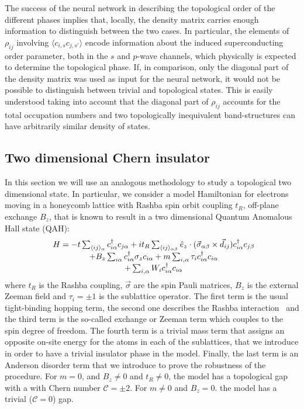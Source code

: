 The success of the neural network in describing the topological order of the
different phases implies that, locally, the density matrix carries
enough information to distinguish between the two cases. In particular, the
elements of $\rho_{ij}$ involving $\langle c_{i,s} c_{j,s'}\rangle$ encode
information about the induced superconducting order parameter, both in the $s$
and $p$-wave channels, which physically is expected to determine the topological
phase.
If, in comparison, only the diagonal part of the density matrix was used
as input for the neural network, it would not be possible to distinguish between
trivial and topological states.
This is easily understood taking into account that the diagonal part of
$\rho_{ij}$ accounts for the total occupation numbers and two topologically
inequivalent band-structures can have arbitrarily similar density of states.

\subsection{Two dimensional Chern insulator}
\label{sec:2d}
In this section we will use an analogous methodology to study a topological two
dimensional state. In particular, we consider a model Hamiltonian for
electrons moving in a honeycomb lattice with Rashba spin orbit coupling $t_R$,
off-plane exchange $B_z$, that is known to result in a two dimensional Quantum
Anomalous Hall state (QAH)\cite{Qiao2010}:
\begin{equation}
\begin{array}{c@{}l}
  H = -t\sum_{\langle ij\rangle_\alpha}\crea{c}{i\alpha}\des{c}{j\alpha}
    + i t_R\sum_{\langle ij\rangle_{\alpha\beta}}
    \hat{e}_z\cdot(\vec{\sigma}_{\alpha\beta}\times\vec{d}_{ij})
                                         \crea{c}{i\alpha}\des{c}{j\beta}\\
    +B_z\sum_{i\alpha}\crea{c}{i\alpha}\sigma_z\des{c}{i\alpha}
    +m\sum_{i,\alpha}\tau_i\crea{c}{i\alpha}\des{c}{i\alpha}  \\
  +\sum_{i,\alpha} W_i \crea{c}{i\alpha}\des{c}{i\alpha}
  \end{array}
\label{hamil:2d}
\end{equation}
where $t_R$ is the Rashba coupling, $\vec{\sigma}$ are the spin Pauli matrices,
$B_z$ is the external Zeeman field and $\tau_i=\pm1$ is the sublattice operator.
The first term is the usual tight-binding hopping term, the second one describes
the Rashba interaction~\cite{Qiao2010,Min2006} and the third term is the
so-called exchange or Zeeman term which couples to the spin degree of freedom.
The fourth term is a trivial mass term that assigns an opposite on-site
energy for the atoms in each of the sublattices, that we introduce in order
to have a trivial insulator phase in the model.
Finally, the last term is an Anderson disorder term that we introduce
to prove the robustness of the procedure. For $m=0$, and $B_z\neq0$ and
$t_R\neq 0$, the model has a topological gap with a  with Chern number
$\mathcal{C}=\pm 2$. For $m\neq 0$ and $B_z=0$. the model has a trivial
($\mathcal{C}=0$) gap.

